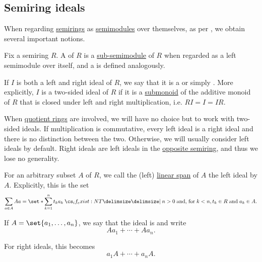 \subsection{Semiring ideals}\label{subsec:semiring_ideals}

When regarding \hyperref[def:semiring]{semirings} as \hyperref[def:semimodule]{semimodules} over themselves, as per , we obtain several important notions.

\begin{definition}\label{def:semiring_ideal}\mimprovised
  Fix a semiring \( R \). A  of \( R \) is a \hyperref[def:semimodule/submodel]{sub-semimodule} of \( R \) when regarded as a left semimodule over itself, and a  is defined analogously.

  If \( I \) is both a left and right ideal of \( R \), we say that it is a  or simply . More explicitly, \( I \) is a two-sided ideal of \( R \) if it is a \hyperref[def:monoid/submodel]{submonoid} of the additive monoid of \( R \) that is closed under left and right multiplication, i.e. \( RI = I = IR \).

  When \hyperref[def:ring/quotient]{quotient rings} are involved, we will have no choice but to work with two-sided ideals. If multiplication is commutative, every left ideal is a right ideal and there is no distinction between the two. Otherwise, we will usually consider left ideals by default. Right ideals are left ideals in the \hyperref[def:semiring/opposite]{opposite semiring}, and thus we lose no generality.

  \begin{thmenum}
     For an arbitrary subset \( A \) of \( R \), we call the (left) \hyperref[def:semimodule/submodel]{linear span} of \( A \) the left ideal  by \( A \). Explicitly, this is the set
    \begin{equation*}
      \sum_{a \in A} A a = \set*{ \sum_{k=1}^n t_k a_k \given* n > 0 \T{and, for} k < n, t_k \in R \T{and} a_k \in A }.
    \end{equation*}

    If \( A = \set{ a_1, \ldots, a_n } \), we say that the ideal is  and write
    \begin{equation*}
      A a_1 + \cdots + A a_n.
    \end{equation*}

    For right ideals, this becomes
    \begin{equation*}
      a_1 A + \cdots + a_n A.
    \end{equation*}


\end{thmenum}
\end{definition}
